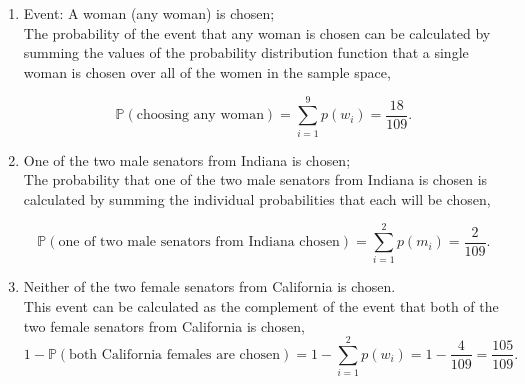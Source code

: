 \documentclass[12pt]{article}
\begin{document}
\begin{center}
\begin{enumerate}[label=(\alph*)]
\item Event: A woman (any woman) is chosen; \\
\vspace{.3cm}
\noindent
The probability of the event that any woman is chosen can be calculated by summing the values of the probability distribution function that a single woman is chosen over all of the women in the sample space,

\begin{equation*}
\mathbb{P}(\text{choosing any woman}) = \sum_{i=1}^{9} p(w_i) = \frac{18}{109}.
\end{equation*}

\item One of the two male senators from Indiana is chosen; \\
\vspace{.3cm}
\noindent
The probability that one of the two male senators from Indiana is chosen is calculated by summing the individual probabilities that each will be chosen,

\begin{equation*}
\mathbb{P}(\text{one of two male senators from Indiana chosen}) = \sum_{i=1}^{2} p(m_i) = \frac{2}{109}.
\end{equation*}

\item Neither of the two female senators from California is chosen. \\
\vspace{.3cm}
\noindent
This event can be calculated as the complement of the event that both of the two female senators from California is chosen,
\begin{equation*}
1-\mathbb{P}(\text{both California females are chosen}) = 1-\sum_{i=1}^{2} p(w_i) = 1 - \frac{4}{109} = \frac{105}{109}.
\end{equation*}

\end{enumerate}
\end{center}

\end{document}
